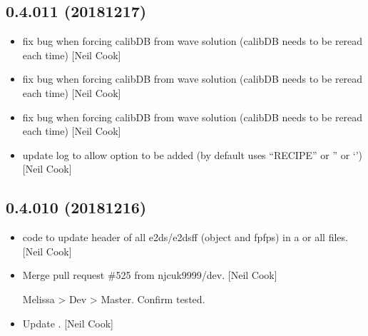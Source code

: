 \documentclass[a4paper,10pt,english]{report}
\begin{document}
\subsection{0.4.011 (2018\sphinxhyphen{}12\sphinxhyphen{}17)}
\label{\detokenize{misc/changelog:id248}}\begin{itemize}
\item {} 
 \sphinxhyphen{} fix bug when forcing calibDB from wave
solution (calibDB needs to be re\sphinxhyphen{}read each time) {[}Neil Cook{]}

\item {} 
 \sphinxhyphen{} fix bug when forcing calibDB from wave
solution (calibDB needs to be re\sphinxhyphen{}read each time) {[}Neil Cook{]}

\item {} 
 \sphinxhyphen{} fix bug when forcing calibDB from wave
solution (calibDB needs to be re\sphinxhyphen{}read each time) {[}Neil Cook{]}

\item {} 
 \sphinxhyphen{} update log to allow option to be added (by default uses
“RECIPE” or ” or ‘’) {[}Neil Cook{]}

\end{itemize}


\subsection{0.4.010 (2018\sphinxhyphen{}12\sphinxhyphen{}16)}
\label{\detokenize{misc/changelog:id249}}\begin{itemize}
\item {} 
 \sphinxhyphen{} code to update header of all e2ds/e2dsff
(object and fpfps) in a  or all files. {[}Neil Cook{]}

\item {} 
Merge pull request \#525 from njcuk9999/dev. {[}Neil Cook{]}

Melissa \textendash{}\textgreater{} Dev \textendash{}\textgreater{} Master. Confirm tested.

\item {} 
Update . {[}Neil Cook{]}

\end{itemize}
\end{document}
